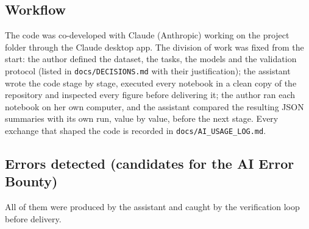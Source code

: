 
\subsection*{Workflow}

The code was co-developed with Claude (Anthropic) working on the project folder through the Claude
desktop app. The division of work was fixed from the start: the author defined the dataset, the tasks,
the models and the validation protocol (listed in \texttt{docs/\allowbreak{}DECISIONS.\allowbreak{}md} with their justification);
the assistant wrote the code stage by stage, executed every notebook in a clean copy of the repository
and inspected every figure before delivering it; the author ran each notebook on her own computer, and
the assistant compared the resulting JSON summaries with its own run, value by value, before the next
stage. Every exchange that shaped the code is recorded in \texttt{docs/\allowbreak{}AI\_\allowbreak{}USAGE\_\allowbreak{}LOG.\allowbreak{}md}.

\subsection*{Errors detected (candidates for the AI Error Bounty)}

All of them were produced by the assistant and caught by the verification loop before delivery.

